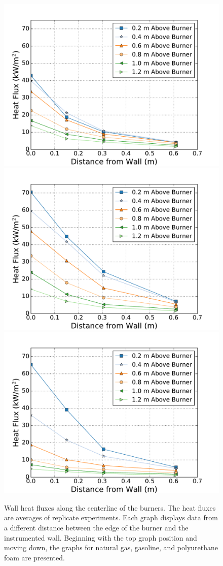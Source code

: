 \documentclass[twoside]{uocthesis}
\begin{document}
{\begin{figure}[p]
	\centering
	\includegraphics[width=.6\columnwidth]{../Figures/NCTW_NG_HF_Center_Avg} \\
	\includegraphics[width=.6\columnwidth]{../Figures/NCTW_GAS_HF_Center_Avg}\\
	\includegraphics[width=.6\columnwidth]{../Figures/NCTW_PUF_HF_Center_Avg} \\
	\caption[Wall heat flux along the centerline of the burners]{Wall heat fluxes along the centerline of the burners.  The heat fluxes are averages of replicate experiments. Each graph displays data from a different distance between the edge of the burner and the instrumented wall.  Beginning with the top graph position and moving down, the graphs for natural gas, gasoline, and polyurethane foam are presented.}
	\label{NCTW_HF_Center_Comp}
\end{figure}

}
\end{document}
